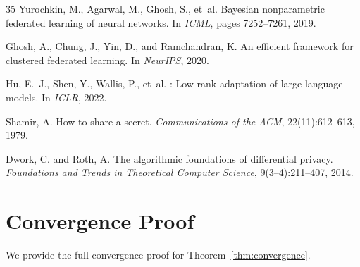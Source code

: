 \documentclass[11pt,a4paper]{article}
\begin{document}
\begin{thebibliography}{35}
Yurochkin, M., Agarwal, M., Ghosh, S., et~al.
\newblock Bayesian nonparametric federated learning of neural networks.
\newblock In \emph{ICML}, pages 7252--7261, 2019.

Ghosh, A., Chung, J., Yin, D., and Ramchandran, K.
\newblock An efficient framework for clustered federated learning.
\newblock In \emph{NeurIPS}, 2020.

Hu, E.~J., Shen, Y., Wallis, P., et~al.
: Low-rank adaptation of large language models.
\newblock In \emph{ICLR}, 2022.

Shamir, A.
\newblock How to share a secret.
\newblock \emph{Communications of the ACM}, 22(11):612--613, 1979.

Dwork, C. and Roth, A.
\newblock The algorithmic foundations of differential privacy.
\newblock \emph{Foundations and Trends in Theoretical Computer Science}, 9(3--4):211--407, 2014.

\end{thebibliography}

\appendix

\section{Convergence Proof}
\label{app:proof}

We provide the full convergence proof for Theorem~\ref{thm:convergence}.
\end{document}
